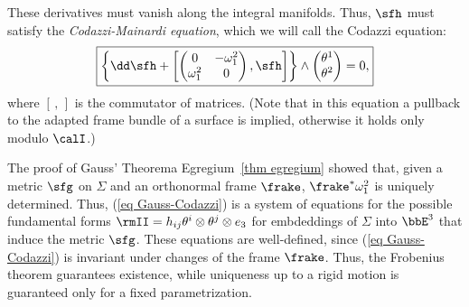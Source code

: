 These derivatives must vanish along the integral manifolds. Thus, $\sfh$ must satisfy the \emph{Codazzi-Mainardi equation}, which we will call the Codazzi equation:
\[\boxed{\left\{\dd \sfh+\left[
\begin{pmatrix}
    0 & -\omega_1^2\\
    \omega_1^2 & 0
\end{pmatrix},\sfh
\right]\right\} \wedge 
\begin{pmatrix}
    \theta^1\\\theta^2
\end{pmatrix}=0,}\label{eq Gauss-Codazzi}
\]
where $[\,,\,]$ is the commutator of matrices. (Note that in this equation a pullback to the adapted frame bundle of a surface is implied, otherwise it holds only modulo $\calI$.)

The proof of Gauss' Theorema Egregium~\ref{thm egregium} showed that, given a metric $\sfg$ on $\Sigma$ and an orthonormal frame $\frake$, $\frake^\ast \omega_1^2$ is uniquely determined. Thus, (\ref{eq Gauss-Codazzi}) is a system of equations for the possible fundamental forms $\rmII=h_{ij}\theta^i\otimes \theta^j\otimes e_3$ for embdeddings of $\Sigma$ into $\bbE^3$ that induce the metric $\sfg$. These equations are well-defined, since (\ref{eq Gauss-Codazzi}) is invariant under changes of the frame $\frake$. Thus, the Frobenius theorem guarantees existence, while uniqueness up to a rigid motion is guaranteed only for a fixed parametrization.

